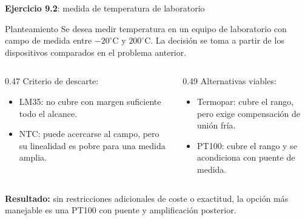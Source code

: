 \documentclass[aspectratio=169,9pt]{beamer}
\newcommand{\exercise}[1]{\textbf{Ejercicio #1}}
\newcommand{\result}[1]{\textbf{\color{eiTeal}Resultado:} #1}
\begin{document}
\begin{frame}{\exercise{9.2}: medida de temperatura de laboratorio}
  \begin{block}{Planteamiento}
    Se desea medir temperatura en un equipo de laboratorio con campo de medida entre \(-20^\circ\mathrm{C}\) y \(200^\circ\mathrm{C}\). La decisión se toma a partir de los dispositivos comparados en el problema anterior.
  \end{block}

  \begin{columns}[T,onlytextwidth]
    \begin{column}{0.47\textwidth}
      Criterio de descarte:
      \begin{itemize}
        \item LM35: no cubre con margen suficiente todo el alcance.
        \item NTC: puede acercarse al campo, pero su linealidad es pobre para una medida amplia.
      \end{itemize}
    \end{column}
    \begin{column}{0.49\textwidth}
      Alternativas viables:
      \begin{itemize}
        \item Termopar: cubre el rango, pero exige compensación de unión fría.
        \item PT100: cubre el rango y se acondiciona con puente de medida.
      \end{itemize}
    \end{column}
  \end{columns}

  \result{sin restricciones adicionales de coste o exactitud, la opción más manejable es una PT100 con puente y amplificación posterior.}
\end{frame}
\end{document}
